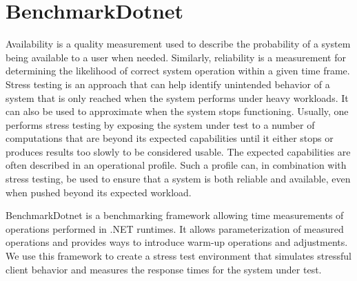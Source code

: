 \section*{BenchmarkDotnet}
Availability is a quality measurement used to describe the probability of a system being available to a user when needed. Similarly, reliability is a measurement for determining the likelihood of correct system operation within a given time frame. \cite{reliabilityAvailability}
Stress testing is an approach that can help identify unintended behavior of a system that is only reached when the system performs under heavy workloads.
It can also be used to approximate when the system stops functioning.
Usually, one performs stress testing by exposing the system under test to a number of computations that are beyond its expected capabilities until it either stops or produces results too slowly to be considered usable\cite{Sommerville10}.
The expected capabilities are often described in an operational profile\cite{OperationalProfiles}.
Such a profile can, in combination with stress testing, be used to ensure that a system is both reliable and available, even when pushed beyond its expected workload.

BenchmarkDotnet\cite{Benchmarkdotnet} is a benchmarking framework allowing time measurements of operations performed in .NET runtimes.
It allows parameterization of measured operations and provides ways to introduce warm-up operations and adjustments.
We use this framework to create a stress test environment that simulates stressful client behavior and measures the response times for the system under test.